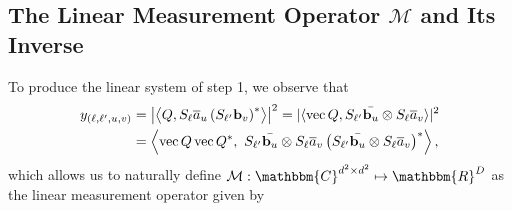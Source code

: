 
\subsection{The Linear Measurement Operator $\mathcal{M}$ and Its Inverse}
\label{sec:linear}
To produce the linear system of step 1, we observe that
\begin{align*}%
y_{(\ell,\ell',u,v)} &= \left| \left\langle Q, S_{\ell} \a_u \left(S_{\ell'} \b_v \right)^* \right\rangle \right|^2 = |\langle \vec{Q}, S_{\ell'} \bar{\b_u} \otimes S_{\ell} \a_v \rangle |^2 \\%
&= \left\langle  \vec{Q} \vec{Q}^*, ~S_{\ell'} \bar{\b_u} \otimes S_{\ell} \a_v \left(S_{\ell'} \bar{\b_u} \otimes S_{\ell} \a_v\right)^* \right\rangle,
\end{align*} %
which allows us to naturally define $\mathcal{M}: \mathbbm{C}^{d^2 \times d^2} \mapsto \mathbbm{R}^D$ as the linear measurement operator given by 
